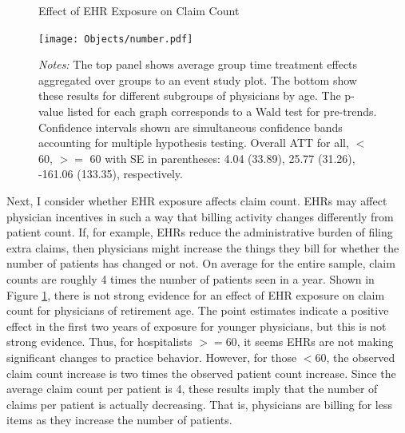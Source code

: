 \documentclass[12pt]{article}
\begin{document}
\begin{figure}[ht]
    \centering
    \captionsetup{width=.85\linewidth}
    \caption{Effect of EHR Exposure on Claim Count}
    \texttt{[image: Objects/number.pdf]}
    \label{fig:claim}
    \vspace{2mm}
    \caption*{\footnotesize{\textit{Notes:} The top panel shows average group time treatment effects aggregated over groups to an event study plot. The bottom show these results for different subgroups of physicians by age. The p-value listed for each graph corresponds to a Wald test for pre-trends. Confidence intervals shown are simultaneous confidence bands accounting for multiple hypothesis testing. Overall ATT for all, $<$ 60, $>=$ 60 with SE in parentheses: 4.04 (33.89), 25.77 (31.26), -161.06 (133.35), respectively.}}
\end{figure}

Next, I consider whether EHR exposure affects claim count. EHRs may affect physician incentives in such a way that billing activity changes differently from patient count. If, for example, EHRs reduce the administrative burden of filing extra claims, then physicians might increase the things they bill for whether the number of patients has changed or not. On average for the entire sample, claim counts are roughly 4 times the number of patients seen in a year. Shown in Figure \ref{fig:claim}, there is not strong evidence for an effect of EHR exposure on claim count for physicians of retirement age. The point estimates indicate a positive effect in the first two years of exposure for younger physicians, but this is not strong evidence. Thus, for hospitalists $>= 60$, it seems EHRs are not making significant changes to practice behavior. However, for those $< 60$, the observed claim count increase is two times the observed patient count increase. Since the average claim count per patient is 4, these results imply that the number of claims per patient is actually decreasing. That is, physicians are billing for less items as they increase the number of patients.   
\end{document}
